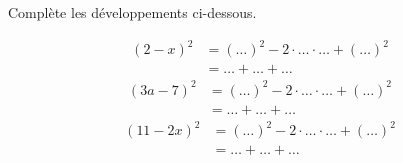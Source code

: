 %
%
Complète les développements ci-dessous.
  \begin{tasks}
    \task
    \begin{align*}
      \left(2-x\right)^2
      &= \left(\dots\right)^2 - 2 \cdot \dots \cdot \dots + \left(\dots\right)^2 \\
      &= \dots + \dots + \dots
    \end{align*}
    \task
    \begin{align*}
      \left(3a-7\right)^2
      &= \left(\dots\right)^2 - 2 \cdot \dots \cdot \dots + \left(\dots\right)^2 \\
      &= \dots + \dots + \dots
    \end{align*}
    \task
    \begin{align*}
      \left(11-2x\right)^2
      &= \left(\dots\right)^2 - 2 \cdot \dots \cdot \dots + \left(\dots\right)^2 \\
      &= \dots + \dots + \dots
    \end{align*}
  \end{tasks}
